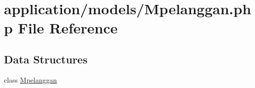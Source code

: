 \hypertarget{_mpelanggan_8php}{}\section{application/models/\+Mpelanggan.php File Reference}
\label{_mpelanggan_8php}
\subsection*{Data Structures}
\begin{DoxyCompactItemize}
\item 
class \mbox{\hyperlink{class_mpelanggan}{Mpelanggan}}
\end{DoxyCompactItemize}
